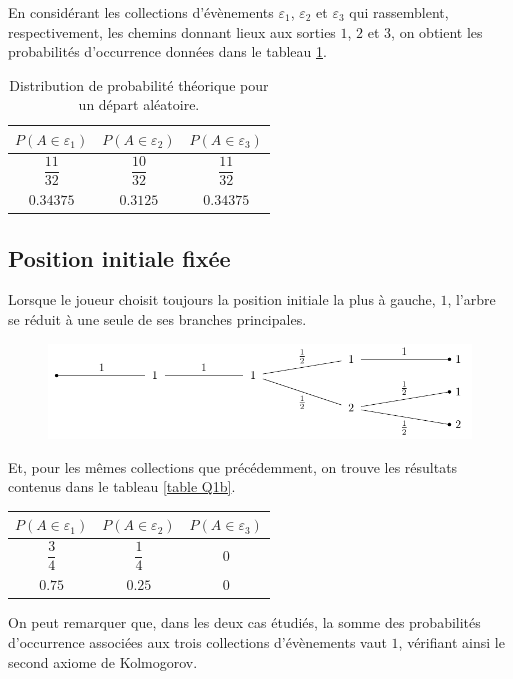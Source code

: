 \documentclass[a4paper, 12pt]{article}
\begin{document}
	En considérant les collections d'évènements $\varepsilon_1$, $\varepsilon_2$ et $\varepsilon_3$ qui rassemblent, respectivement, les chemins donnant lieux aux sorties $1$, $2$ et $3$, on obtient les probabilités d'occurrence données dans le tableau \ref{table: Q1a}.
	\begin{table}[H]
		\centering
		\begin{tabular}{|c|c|c|}
			\hline
			$P(A \in \varepsilon_1)$ & $P(A \in \varepsilon_2)$ & $P(A \in \varepsilon_3)$ \\ \hline\hline
			\multirow{2}{*}{$\dfrac{11}{32}$} & \multirow{2}{*}{$\dfrac{10}{32}$} & \multirow{2}{*}{$\dfrac{11}{32}$} \\
			&& \\ \hline	
			$\num{0.34375}$ & $\num{0.3125}$ & $\num{0.34375}$ \\ \hline
		\end{tabular}
		\caption{Distribution de probabilité théorique pour un départ aléatoire.}
		\label{table: Q1a}
	\end{table}
	\subsection{Position initiale fixée}
	Lorsque le joueur choisit toujours la position initiale la plus à gauche, \cad $1$, l'arbre se réduit à une seule de ses branches principales.
	\begin{figure}[H]
		\centering
		\includegraphics[scale = 0.95]{resources/tikz/lehman_leighton_1/lehman_leighton_1.pdf}
	\end{figure}
	Et, pour les mêmes collections que précédemment, on trouve les résultats contenus dans le tableau \ref{table Q1b}.
	\begin{table}[H]
		\centering
		\begin{tabular}{|c|c|c|}
			\hline
			$P(A \in \varepsilon_1)$ & $P(A \in \varepsilon_2)$ & $P(A \in \varepsilon_3)$ \\ \hline\hline
			\multirow{2}{*}{$\dfrac{3}{4}$} & \multirow{2}{*}{$\dfrac{1}{4}$} & \multirow{2}{*}{$0$} \\
			&& \\ \hline	
			$\num{0.75}$ & $\num{0.25}$ & $\num{0}$ \\ \hline
		\end{tabular}
		\label{table: Q1b}
	\end{table}
	On peut remarquer que, dans les deux cas étudiés, la somme des probabilités d'occurrence associées aux trois collections d'évènements vaut $1$, vérifiant ainsi le second axiome de Kolmogorov.
	\newpage
\end{document}
